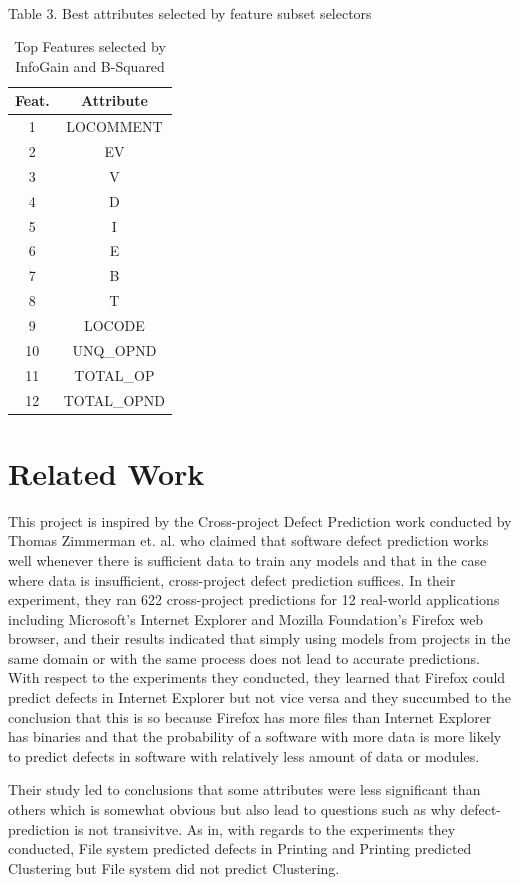 \documentclass{sig-alternate}
\begin{document}
\\Table  3. Best attributes selected by feature subset selectors

\begin{table}
\centering
\caption{Top Features selected by InfoGain and B-Squared}
\begin{tabular}{|c|c|} \hline
Feat.&Attribute\\\hline
1& LOCOMMENT\\ \hline
2& EV\\ \hline
3& V\\ \hline
4& D\\ \hline
5& I\\ \hline
6& E\\ \hline
7& B\\ \hline
8& T\\ \hline
9& LOCODE\\ \hline
10& UNQ_OPND\\ \hline
11& TOTAL_OP\\ \hline
12& TOTAL_OPND\\ \hline

\hline\end{tabular}
\end{table}


\section{Related Work}
This project is inspired by the Cross-project Defect Prediction work conducted by Thomas Zimmerman et. al. who claimed that software defect prediction works well whenever there is sufficient data to train any models and that in the case where data is insufficient, cross-project defect prediction suffices\cite{zimmerman09}. In their experiment, they ran 622 cross-project predictions for 12 real-world applications including Microsoft's Internet Explorer and Mozilla Foundation's Firefox web browser, and their results indicated that simply using models from projects in the same domain or with the same process does not lead to accurate predictions. With respect to the experiments they conducted, they learned that Firefox could predict defects in Internet Explorer but not vice versa and they succumbed to the conclusion that this is so because Firefox has more files than Internet Explorer has binaries and that the probability of a software with more data is more likely to predict defects in software with relatively less amount of data or modules. 

Their study led to conclusions that some attributes were less significant than others which is somewhat obvious but also lead to questions such as why defect-prediction is not transivitve. As in, with regards to the experiments they conducted, File system predicted defects in Printing and Printing predicted Clustering but File system did not predict Clustering.
\end{document}
